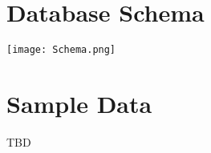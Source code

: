 \documentclass{article}
\begin{document}
\vspace{0.5cm}

\section{Database Schema}

\begin{tcolorbox}[colback=secondarycolor, colframe=primarycolor, arc=5mm]

\begin{center}
\vspace{0.5cm}
 \texttt{[image: Schema.png]}
\end{center}
\end{tcolorbox}

\vspace{0.5cm}

\section{Sample Data}

TBD

\end{document}
